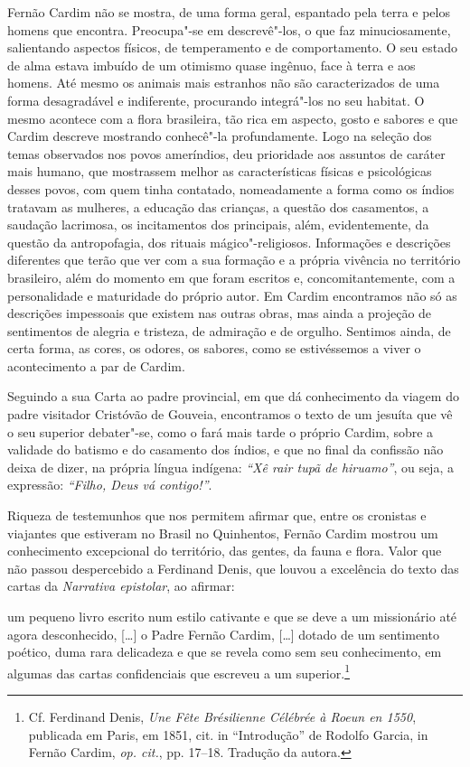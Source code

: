 Fernão Cardim não se mostra, de uma forma geral, espantado pela terra
e pelos homens que encontra. Preocupa"-se em descrevê"-los, o que faz
minuciosamente, salientando aspectos físicos, de temperamento e de
comportamento. O seu estado de alma estava imbuído de um otimismo
quase ingênuo, face à terra e aos homens. Até mesmo os animais mais
estranhos não são caracterizados de uma forma desagradável e
indiferente, procurando integrá"-los no seu habitat. O mesmo acontece
com a flora brasileira, tão rica em aspecto, gosto e sabores e que
Cardim descreve mostrando conhecê"-la profundamente. Logo na seleção
dos temas observados nos povos ameríndios, deu prioridade aos assuntos
de caráter mais humano, que mostrassem melhor as características
físicas e psicológicas desses povos, com quem tinha contatado,
nomeadamente a forma como os índios tratavam as mulheres, a educação
das crianças, a questão dos casamentos, a saudação lacrimosa, os
incitamentos dos principais, além, evidentemente, da questão da
antropofagia, dos rituais mágico"-religiosos. 
Informações e descrições diferentes que terão que ver com a sua
formação e a própria vivência no território brasileiro, além do momento
em que foram escritos e, concomitantemente, com a personalidade e
maturidade do próprio autor. Em Cardim encontramos não só as descrições
impessoais que existem nas outras obras, mas ainda a projeção de
sentimentos de alegria e tristeza, de admiração e de orgulho.
Sentimos ainda, de certa forma, as cores, os odores, os sabores, como
se estivéssemos a viver o acontecimento a par de Cardim.

Seguindo a sua Carta ao padre provincial, em que dá conhecimento da
viagem do padre visitador Cristóvão de Gouveia, encontramos o texto de
um jesuíta que vê o seu superior debater"-se, como o fará mais tarde o
próprio Cardim, sobre a validade do batismo e do casamento dos índios,
e que no final da confissão não deixa de dizer, na própria língua
indígena: \textit{``Xê rair tupã de hiruamo''}, ou seja, a expressão: \textit{``Filho, Deus vá contigo!''}. 

Riqueza de testemunhos que nos permitem afirmar que, entre os
cronistas e viajantes que estiveram no Brasil no Quinhentos, Fernão
Cardim mostrou um conhecimento excepcional do território, das gentes,
da fauna e flora. Valor que não passou despercebido a Ferdinand Denis,
que louvou a excelência do texto das cartas da \textit{Narrativa
epistolar}, ao afirmar:

\begin{hedraquote}
um pequeno livro escrito num estilo cativante e que se deve a um missionário
até agora desconhecido, [\ldots{}] o Padre Fernão Cardim, [\ldots{}] dotado de um
sentimento poético, duma rara delicadeza e que se revela como sem seu
conhecimento, em algumas das cartas confidenciais que escreveu a um
superior.\footnote{ Cf. Ferdinand Denis, \textit{Une Fête Brésilienne 
Célébrée à Roeun en 1550}, publicada em Paris, em 1851,
cit. in ``Introdução'' de Rodolfo Garcia, in Fernão Cardim, \textit{op. cit.}, 
pp. 17--18. Tradução da autora.} 
\end{hedraquote}

